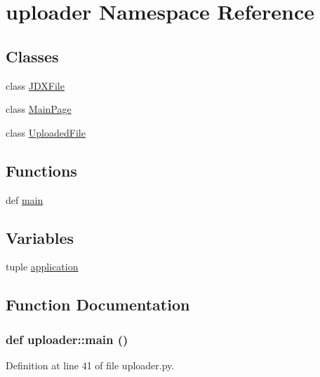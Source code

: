 \hypertarget{namespaceuploader}{
\section{uploader Namespace Reference}
\label{namespaceuploader}
}
\subsection*{Classes}
\begin{DoxyCompactItemize}
\item 
class \hyperlink{classuploader_1_1_j_d_x_file}{JDXFile}
\item 
class \hyperlink{classuploader_1_1_main_page}{MainPage}
\item 
class \hyperlink{classuploader_1_1_uploaded_file}{UploadedFile}
\end{DoxyCompactItemize}
\subsection*{Functions}
\begin{DoxyCompactItemize}
\item 
def \hyperlink{namespaceuploader_a1601027914910a00f338ba6dd3ae1e80}{main}
\end{DoxyCompactItemize}
\subsection*{Variables}
\begin{DoxyCompactItemize}
\item 
tuple \hyperlink{namespaceuploader_a84bbed69751228281d405bfe08a3cc1d}{application}
\end{DoxyCompactItemize}


\subsection{Function Documentation}
\hypertarget{namespaceuploader_a1601027914910a00f338ba6dd3ae1e80}{
\subsubsection[{main}]{\setlength{\rightskip}{0pt plus 5cm}def uploader::main ()}}
\label{namespaceuploader_a1601027914910a00f338ba6dd3ae1e80}


Definition at line 41 of file uploader.py.



